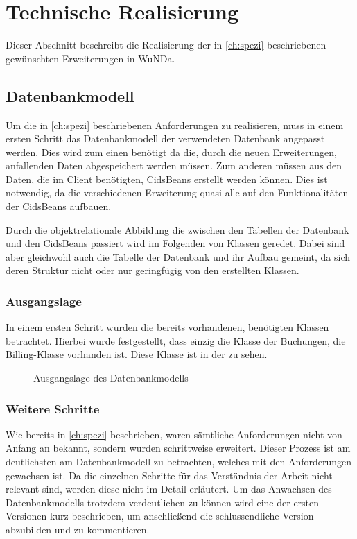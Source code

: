 \section{Technische Realisierung}
Dieser Abschnitt beschreibt die Realisierung der in \autoref{ch:spezi} beschriebenen gewünschten Erweiterungen in \ac{WuNDa}.

\subsection{Datenbankmodell}
Um die in \autoref{ch:spezi} beschriebenen Anforderungen zu realisieren, muss in einem ersten Schritt das Datenbankmodell der verwendeten Datenbank angepasst werden.
Dies wird zum einen benötigt da die, durch die neuen Erweiterungen, anfallenden Daten abgespeichert werden müssen. Zum anderen müssen aus den Daten, die im Client benötigten, CidsBeans erstellt werden können. Dies ist notwendig, da die verschiedenen Erweiterung quasi alle auf den Funktionalitäten der CidsBeans aufbauen.

Durch die objektrelationale Abbildung die zwischen den Tabellen der Datenbank und den CidsBeans passiert wird im Folgenden von Klassen geredet. Dabei sind aber gleichwohl auch die Tabelle der Datenbank und ihr Aufbau gemeint, da sich deren Struktur nicht oder nur geringfügig von den erstellten Klassen.

\subsubsection{Ausgangslage}
In einem ersten Schritt wurden die bereits vorhandenen, benötigten Klassen betrachtet. Hierbei wurde festgestellt, dass einzig die Klasse der Buchungen, die Billing-Klasse vorhanden ist. Diese Klasse ist in der  zu sehen.
\begin{figure}[htb]
	\centering
	\caption{Ausgangslage des Datenbankmodells}
	\label{fig:db-billing}
\end{figure}

\subsubsection{Weitere Schritte}
Wie bereits in \autoref{ch:spezi} beschrieben, waren sämtliche Anforderungen nicht von Anfang an bekannt, sondern wurden schrittweise erweitert. Dieser Prozess ist am deutlichsten am Datenbankmodell zu betrachten, welches mit den Anforderungen gewachsen ist.
Da die einzelnen Schritte für das Verständnis der Arbeit nicht relevant sind, werden diese nicht im Detail erläutert. Um das Anwachsen des Datenbankmodells trotzdem verdeutlichen zu können wird eine der ersten Versionen kurz beschrieben, um anschließend die schlussendliche Version abzubilden und zu kommentieren.

